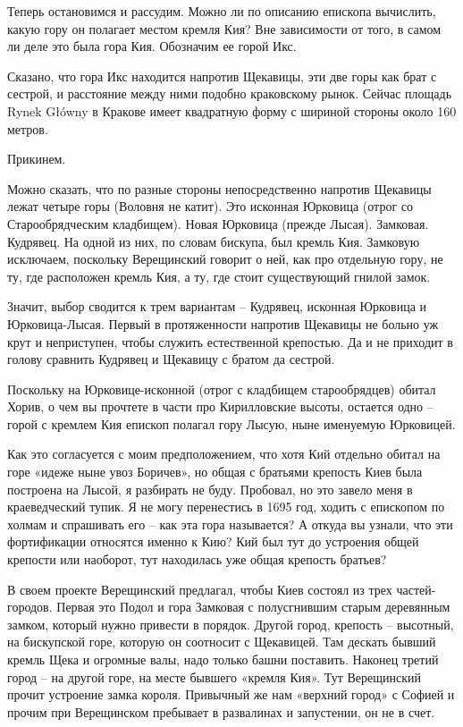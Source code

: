 Теперь остановимся и рассудим. Можно ли по описанию епископа вычислить, какую гору он полагает местом кремля Кия? Вне зависимости от того, в самом ли деле это была гора Кия. Обозначим ее горой Икс.

Сказано, что гора Икс находится напротив Щекавицы, эти две горы как брат с сестрой, и расстояние между ними подобно краковскому рынок. Сейчас площадь Rynek Główny в Кракове имеет квадратную форму с шириной стороны около 160 метров.

Прикинем.

Можно сказать, что по разные стороны непосредственно напротив Щекавицы лежат четыре горы (Воловня не катит). Это исконная Юрковица (отрог со Старообрядческим кладбищем). Новая Юрковица (прежде Лысая). Замковая. Кудрявец. На одной из них, по словам бискупа, был кремль Кия. Замковую исключаем, поскольку Верещинский говорит о ней, как про отдельную гору, не ту, где расположен кремль Кия, а ту, где стоит существующий гнилой замок.

Значит, выбор сводится к трем вариантам – Кудрявец, исконная Юрковица и Юрковица-Лысая. Первый в протяженности напротив Щекавицы не больно уж крут и неприступен, чтобы служить естественной крепостью. Да и не приходит в голову сравнить Кудрявец и Щекавицу с братом да сестрой.

Поскольку на Юрковице-исконной (отрог с кладбищем старообрядцев) обитал Хорив, о чем вы прочтете в части про Кирилловские высоты, остается одно – горой с кремлем Кия епископ полагал гору Лысую, ныне именуемую Юрковицей.

Как это согласуется с моим предположением, что хотя Кий отдельно обитал на горе «идеже ныне увоз Боричев», но общая с братьями крепость Киев была построена на Лысой, я разбирать не буду. Пробовал, но это завело меня в краеведческий тупик. Я не могу перенестись в 1695 год, ходить с епископом по холмам и спрашивать его – как эта гора называется? А откуда вы узнали, что эти фортификации относятся именно к Кию? Кий был тут до устроения общей крепости или наоборот, тут находилась уже общая крепость братьев?

В своем проекте Верещинский предлагал, чтобы Киев состоял из трех частей-городов. Первая это Подол и гора Замковая с полусгнившим старым деревянным замком, который нужно привести в порядок. Другой город, крепость – высотный, на бискупской горе, которую он соотносит с Щекавицей. Там дескать бывший кремль Щека и огромные валы, надо только башни поставить. Наконец третий город – на другой горе, на месте бывшего «кремля Кия». Тут Верещинский прочит устроение замка короля. Привычный же нам «верхний город» с Софией и прочим при Верещинском пребывает в развалинах и запустении, он не в счет.

